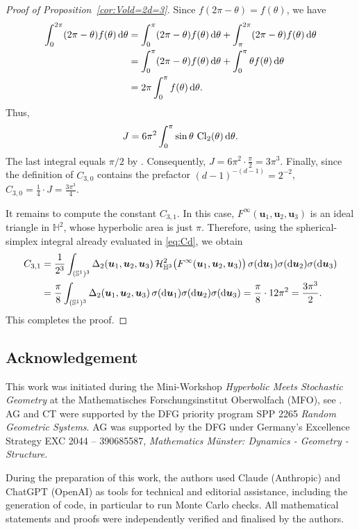 \documentclass[11pt,a4paper]{article}
\theoremstyle{plain}
\theoremstyle{definition}
\theoremstyle{remark}
\newcommand{\dint}{\textup{d}}
\newcommand{\bu}{\boldsymbol{u}}
\def\HH{\mathbb{H}}
\def\SS{\mathbb{S}}
\def\cH{\mathcal{H}}
\begin{document}
\begin{proof}[Proof of Proposition~\ref{cor:Vold=2d=3}]
	Since $f(2\pi-\theta)=f(\theta)$, we have
	\[
		\begin{aligned}
			\int_0^{2\pi}(2\pi-\theta)f(\theta)\,\dint\theta
			 & =
			\int_0^\pi (2\pi-\theta)f(\theta)\,\dint\theta
			+
			\int_\pi^{2\pi} (2\pi-\theta)f(\theta)\,\dint\theta \\
			 & =
			\int_0^\pi (2\pi-\theta)f(\theta)\,\dint\theta
			+
			\int_0^\pi \theta f(\theta)\,\dint\theta            \\
			 & =
			2\pi\int_0^\pi f(\theta)\,\dint\theta .
		\end{aligned}
	\]
	Thus,
	\[
		J
		=
		6\pi^2
		\int_0^\pi
		\sin\theta\,\operatorname{Cl}_2(\theta)\,\dint\theta .
	\]
	The last integral equals $\pi/2$ by \cite[Theorem 6]{Lima}.
	Consequently, $J=6\pi^2\cdot\frac{\pi}{2}=3\pi^3$.
	Finally, since the definition of $C_{3,0}$ contains the
	prefactor $(d-1)^{-(d-1)}=2^{-2}$, $C_{3,0}=\frac{1}{4}\cdot J=\frac{3\pi^3}{4}$.

	It remains to compute the constant $C_{3,1}$. In this case,
	$F^\infty(\bu_1,\bu_2,\bu_3)$ is an ideal triangle in $\HH^2$, whose hyperbolic area is just $\pi$.
	Therefore, using the spherical-simplex integral already evaluated in
	\eqref{eq:Cd}, we obtain
	\begin{align*}
		C_{3,1}
		 & =
		\frac{1}{2^3}
		\int_{(\SS^1)^3}
		\Delta_2(\bu_1,\bu_2,\bu_3)\,
		\cH_{\HH^3}^{2}\bigl(
		F^\infty(\bu_1,\bu_2,\bu_3)
		\bigr)\,
		\sigma(\dint\bu_1)\sigma(\dint\bu_2)\sigma(\dint\bu_3) \\
		 & =
		\frac{\pi}{8}
		\int_{(\SS^1)^3}
		\Delta_2(\bu_1,\bu_2,\bu_3)\,
		\sigma(\dint\bu_1)\sigma(\dint\bu_2)\sigma(\dint\bu_3)
		=
		\frac{\pi}{8}\cdot12\pi^2
		=
		\frac{3\pi^3}{2}.
	\end{align*}
	This completes the proof.
\end{proof}


\subsection*{Acknowledgement}
This work was initiated during the Mini-Workshop \textit{Hyperbolic Meets Stochastic Geometry} at the Mathematisches Forschungsinstitut Oberwolfach (MFO), see \cite{KT26OWR}. AG and CT were supported by the DFG priority program SPP 2265 \textit{Random Geometric Systems}. AG was supported by the DFG under Germany's Excellence Strategy  EXC 2044 -- 390685587, \textit{Mathematics M\"unster: Dynamics - Geometry - Structure}.

During the preparation of this work, the authors used Claude (Anthropic)
and ChatGPT (OpenAI) as tools for technical and editorial assistance,
including the generation of code, in particular to run Monte Carlo checks.
All mathematical statements and proofs were independently verified and finalised by the authors.
\end{document}
